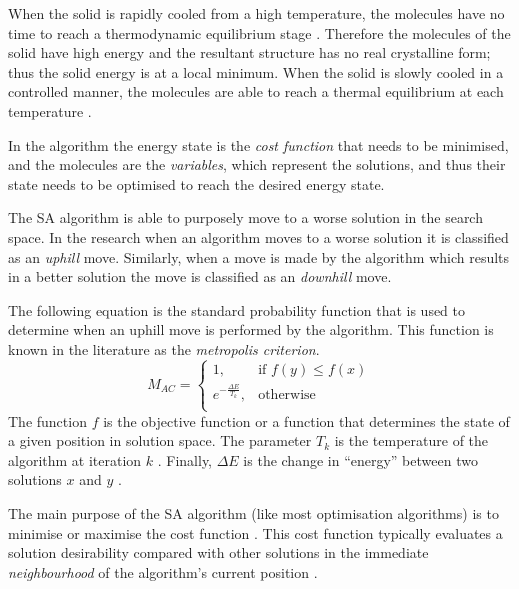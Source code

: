 When the solid is rapidly cooled from a high temperature, the molecules have no time to reach a thermodynamic equilibrium stage \cite{MobileRobotSA,ConstantTempSA}. Therefore the molecules of the solid have high energy and the resultant structure has no real crystalline form; thus the solid energy is at a local minimum\cite{CurveFittingSA,NewSAs,MobileRobotSA}. When the solid is slowly cooled in a controlled manner, the molecules are able to reach a thermal equilibrium at each temperature \cite{ChaosSA,CurveFittingSA,NewSAs}.

In the algorithm the energy state is the \emph{cost function} that needs to be minimised, and the molecules are the \emph{variables}, which represent the solutions, and thus their state needs to be optimised to reach the desired energy state.

The \gls{SA} algorithm is able to purposely move to a worse solution in the search space\cite{EcoEquilSA}. In the research when an algorithm moves to a worse solution it is classified as an \emph{uphill} move\cite{AIModernApproach}. Similarly, when a move is made by the algorithm which results in a better solution the move is classified as an \emph{downhill} move\cite{AIModernApproach}.

The following equation is the standard probability function that is used to determine when an uphill move is performed by the algorithm. This function is known in the literature as the \emph{metropolis criterion}. 
\begin{equation}
\label{eq:saprobability}
	M_{AC} =
	\begin{cases}
	1, &\text{if $f(y) \leq f(x)$}\\
	e^{-\frac{\Delta E}{T_k}} , &\text{otherwise}\\
	\end{cases}
\end{equation}
The function $f$ is the objective function or a function that determines the state of a given position in solution space\cite{EcoEquilSA}. The parameter $T_k$ is the temperature of the algorithm at iteration $k$ \cite{EcoEquilSA}. Finally, $\Delta E$ is the change in ``energy'' between two solutions $x$ and $y$ \cite{EcoEquilSA}.

The main purpose of the \gls{SA} algorithm (like most optimisation algorithms) is to minimise or maximise the cost function \cite{SASingleMultiObj}. This cost function typically evaluates a solution desirability compared with other solutions in the immediate \emph{neighbourhood} of the algorithm's current position \cite{TheoPraticalSA}. 

